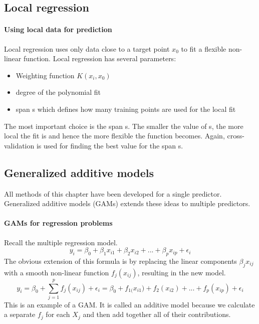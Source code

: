 \documentclass[../document.tex]{subfiles}
\begin{document}
	\subsection{Local regression}
	\paragraph{Using local data for prediction}
	Local regression uses only data close to a target point \(x_{0}\) to fit a flexible non-linear function. Local regression has several parameters:
	\begin{itemize}
		\item Weighting function \(K(x_{i},x_{0})\)
		\item degree of the polynomial fit
		\item span s which defines how many training points are used for the local fit
	\end{itemize}
	The most important choice is the span s. The smaller the value of s, the more local the fit is and hence the more flexible the function becomes. Again, cross-validation is used for finding the best value for the span s.
	\subsection{Generalized additive models}
	All methods of this chapter have been developed for a single predictor. Generalized additive models (GAMs) extends these ideas to multiple predictors.
	\paragraph{GAMs for regression problems}
	Recall the multiple regression model.
	\begin{equation}
		y_{i}=\beta_{0}+\beta_{1}x_{i1}+\beta_{2}x_{i2}+...+\beta_{p}x_{ip}+\epsilon_{i}
	\end{equation}
	The obvious extension of this formula is by replacing the linear components \(\beta_{j}x_{ij}\) with a smooth non-linear function \(f_{j}(x_{ij})\), resulting in the new model.
	\begin{equation}
		y_{i}=\beta_{0}+\sum_{j=1}^{p}f_{j}(x_{ij})+\epsilon_{i} = \beta_{0}+f_{1(}x_{i1})+f_{2}(x_{i2})+...+f_{p}(x_{ip})+\epsilon_{i}
	\end{equation}
	This is an example of a GAM. It is called an additive model because we calculate a separate \(f_{j}\) for each \(X_{j}\) and then add together all of their contributions.
\end{document}
